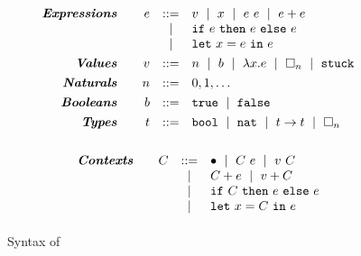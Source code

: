 \begin{figure}
$$
\begin{array}{rrcl}
\emphbf{Expressions} \quad 
  & e & ::=    & v \spmid x \spmid \eapp{e}{e} \spmid \eplus{e}{e}\\
  &   & \spmid & \eif{e}{e}{e} \\
  &   & \spmid & \elet{x}{e}{e} \\[0.05in] 

\emphbf{Values} \quad 
  & v & ::= &  n \spmid b \spmid \efun{x}{e} \spmid \ehole{n} \spmid \stuck \\[0.05in] 

\emphbf{Naturals} \quad
  & n & ::= &  0,1,\ldots \\[0.05in]

\emphbf{Booleans} \quad
  & b & ::= &  \etrue \spmid \efalse \\[0.05in]

\emphbf{Types} \quad 
  & t & ::= & \tbool \spmid \tnat \spmid \tfun{t}{t} \spmid \thole{n} \\[0.1in]
\end{array}
$$

$$
\begin{array}{rrcl}
\textbf{\emph{Contexts}} \quad 
  & C
  & ::= 
  &   	 \bullet 
  \ \mid \  C \ e
  \ \mid \  v \ C \\
  & & \ \mid \  & C + e \ \mid \  v + C \\
  & & \ \mid \  & \mathtt{if}\ C\ \mathtt{then}\ e\ \mathtt{else}\ e \\
  & & \ \mid \  & \mathtt{let}\ x = C\ \mathtt{in}\ e
  \\[0.05in] 
\end{array}
$$



\caption{Syntax of \lang {}}
\label{fig:syntax}
\end{figure}
